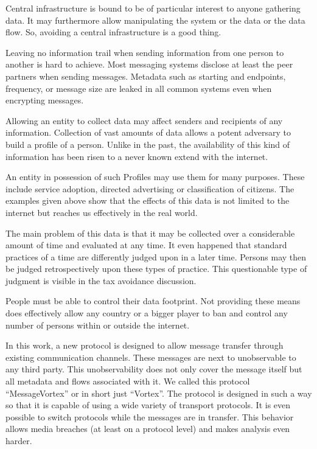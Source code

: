 Central infrastructure is bound to be of particular interest to anyone gathering data. It may furthermore allow manipulating the system or the data or the data flow. So, avoiding a central infrastructure is a good thing.

Leaving no information trail when sending information from one person to another is hard to achieve. Most messaging systems disclose at least the peer partners when sending messages. Metadata such as starting and endpoints, frequency, or message size are leaked in all common systems even when encrypting messages.

Allowing an entity to collect data may affect senders and recipients of any information. Collection of vast amounts of data allows a potent adversary to build a  profile of a person. Unlike in the past, the availability of this kind of information has been risen to a never known extend with the internet.

An entity in possession of such Profiles may use them for many purposes. These include service adoption, directed advertising or classification of citizens. The examples given above show that the effects of this data is not limited to the internet but reaches us effectively in the real world.

The main problem of this data is that it may be collected over a considerable amount of time and evaluated at any time. It even happened that standard practices of a time are differently judged upon in a later time. Persons may then be judged retrospectively upon these types of practice. This questionable type of judgment is visible in the tax avoidance discussion. 

People must be able to control their data footprint. Not providing these means does effectively allow any country or a bigger player to ban and control any number of persons within or outside the internet. 

In this work, a new protocol is designed to allow message transfer through existing communication channels. These messages are next to unobservable to any third party. This unobservability does not only cover the message itself but all metadata and flows associated with it. We called this protocol ``MessageVortex'' or in short just ``Vortex''. The protocol is designed in such a way so that it is capable of using a wide variety of transport protocols. It is even possible to switch protocols while the messages are in transfer. This behavior allows media breaches (at least on a protocol level) and makes analysis even harder.

